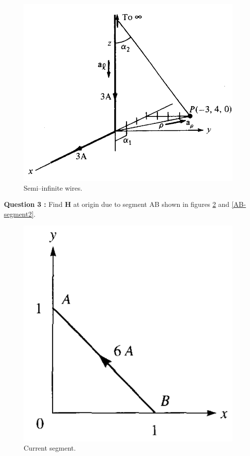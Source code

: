 \documentclass[12pt,a4paper]{article}
\begin{document}
\begin{figure}[H]
\centering
\includegraphics[scale=0.45]{Figure7-7aS.png}
\caption{Semi--infinite wires.}
\label{Semi-infinite-wires}
\end{figure}
\newpage
\noindent\textbf{Question 3 \cite[Problem 7.3 and 7.4, page 297]{Sadiku}:} Find \textbf{H} at origin due to segment AB shown in figures \ref{AB-segment1} and \ref{AB-segment2}.\\
\begin{figure}[H]
\centering
\includegraphics[scale=0.4]{Figure7-26S.png}
\caption{Current segment.}
\label{AB-segment1}
\end{figure}
\end{document}
